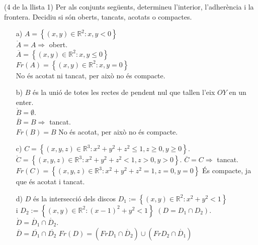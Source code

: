 \documentclass[../main.tex]{subfiles}
\begin{document}
    \begin{exercici}(4 de la llista 1) 
        Per als conjunts següents, determineu l'interior, l'adherència i la frontera. Decidiu si
        són oberts, tancats, acotats o compactes.
        \begin{enumerate}
            \item[a)] $A = \left\{\left(x, y\right) \in \mathbb{R}^2 : x, y < 0\right\}$\\
            $\mathring{A} = A \Rightarrow$ obert.\\
            $\overline{A} = \left\{\left(x, y\right) \in \mathbb{R}^2 : x, y \leq 0\right\}$\\
            $Fr\left(A\right)=\left\{\left(x, y\right) \in \mathbb{R}^2 : x, y = 0\right\}$\\
            No és acotat ni tancat, per això no és compacte.
            \item[b)] $B$ és la unió de totes les rectes de pendent nul que tallen l'eix $OY$ en un enter.\\
            $\mathring{B} = \emptyset$.\\
            $\overline{B} = B \Rightarrow$ tancat.\\
            $Fr\left(B\right) = B$
            No és acotat, per això no és compacte.
            \item[c)] $C = \left\{\left(x, y, z\right) \in \mathbb{R}^3 : x^2 + y^2 + z^2 \leq 1, z \geq 0, y \geq 0\right\}$.\\
            $\mathring{C} = \left\{\left(x, y, z\right) \in \mathbb{R}^3 : x^2 + y^2 + z^2 < 1, z > 0, y > 0\right\}$.
            $\overline{C} = C \Rightarrow$ tancat.\\
            $Fr\left(C\right) = \left\{\left(x, y, z\right) \in \mathbb{R}^3 : x^2 + y^2 + z^2 = 1, z = 0, y = 0\right\}$
            És compacte, ja que és acotat i tancat.
            \item[d)] $D$ és la intersecció dels discos $D_1 := \left\{\left(x, y\right) \in \mathbb{R}^2 : x^2+y^2 < 1\right\}$\\
            i $D_2 := \left\{\left(x, y\right) \in \mathbb{R}^2 : (x-1)^2+y^2 < 1\right\}$ $\left(D = D_1 \cap D_2\right)$.\\ 
            $\mathring{D} = \mathring{D_1} \cap \mathring{D_2}$.\\
            $\overline{D} = \overline{D_1} \cap \overline{D_2}$
            $Fr\left(D\right)  = \left(Fr{D_1} \cap \mathring{D_2}\right)\cup\left(Fr{D_2} \cap \mathring{D_1}\right)$
        \end{enumerate}
    \end{exercici}
\end{document}
